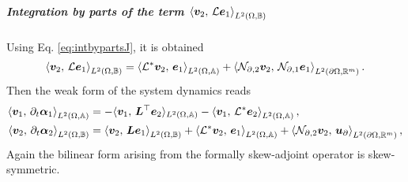 \subparagraph{Integration by parts of the term $\inner[L^2(\Omega, \mathbb{B})]{\bm{v}_2}{\mathcal{L}\bm{e}_1}$}
Using Eq. \eqref{eq:intbypartsJ}, it is obtained 
\begin{equation}
\inner[L^2(\Omega, \mathbb{B})]{\bm{v}_2}{\mathcal{L}\bm{e}_1} = \inner[L^2(\Omega, \mathbb{A})]{\mathcal{L}^*\bm{v}_2}{\bm{e}_1} + \inner[L^2(\partial \Omega, \mathbb{R}^m)]{\mathcal{N}_{\partial, 2} \bm{v}_2}{\mathcal{N}_{\partial, 1} \bm{e}_1}.
\end{equation}
Then the weak form of the system dynamics  reads 
\begin{equation}\label{eq:weak_dyn_intJ2}
\begin{aligned}
\inner[L^2(\Omega, \mathbb{A})]{\bm{v}_1}{\partial_t \bm{\alpha}_1} &=   -  \langle{\bm{v}_1}, \,{\bm{L}^\top \bm{e}_2}\rangle_{L^2(\Omega, \mathbb{A})}  -\inner[L^2(\Omega, \mathbb{A})]{\bm{v}_1}{\mathcal{L}^*\bm{e}_2}, \\
\inner[L^2(\Omega, \mathbb{B})]{\bm{v}_2}{\partial_t \bm{\alpha}_2} &=   \inner[L^2(\Omega, \mathbb{B})]{\bm{v}_2}{\bm{L}\bm{e}_1}  + \inner[L^2(\Omega, \mathbb{A})]{\mathcal{L}^*\bm{v}_2}{\bm{e}_1} + \inner[L^2(\partial \Omega, \mathbb{R}^m)]{\mathcal{N}_{\partial, 2} \bm{v}_2}{\bm{u}_{\partial}}, \\
\end{aligned}
\end{equation}
Again the bilinear form arising from the formally skew-adjoint operator is skew-symmetric.
